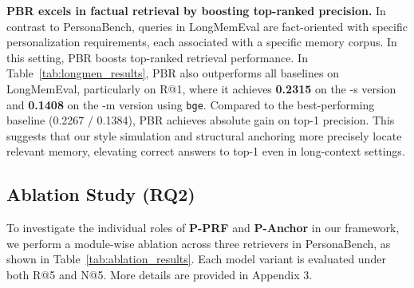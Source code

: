 \textbf{PBR excels in factual retrieval by boosting top-ranked precision.} 
In contrast to PersonaBench, queries in LongMemEval are fact-oriented with specific personalization requirements, each associated with a specific memory corpus. In this setting, PBR boosts top-ranked retrieval performance. In Table~\ref{tab:longmen_results}, PBR also outperforms all baselines on LongMemEval, particularly on R@1, where it achieves \textbf{0.2315} on the -s version and \textbf{0.1408} on the -m version using \texttt{bge}. Compared to the best-performing baseline (0.2267 / 0.1384), PBR achieves absolute gain on top-1 precision. This suggests that our style simulation and structural anchoring more precisely locate relevant memory, elevating correct answers to top-1 even in long-context settings.

\subsection{Ablation Study (RQ2)}
To investigate the individual roles of \textbf{P-PRF} and \textbf{P-Anchor} in our framework, we perform a module-wise ablation across three retrievers in PersonaBench, as shown in Table~\ref{tab:ablation_results}. Each model variant is evaluated under both R@5 and N@5. More details are provided in Appendix 3.

